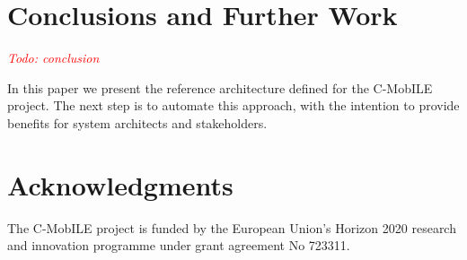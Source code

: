 \documentclass[conference]{IEEEtran}
\newcommand{\todo}[1]{\textcolor{red}{\emph{Todo: #1}}}
\begin{document}
\section{Conclusions and Further Work}

\todo{conclusion}

In this paper we present the reference architecture defined for the C-MobILE project.
The next step is to automate this approach, with the intention to provide benefits for system architects and stakeholders.


\section*{Acknowledgments}

The C-MobILE project is funded by the European Union's Horizon 2020 research and innovation programme under grant agreement No 723311.
\end{document}
